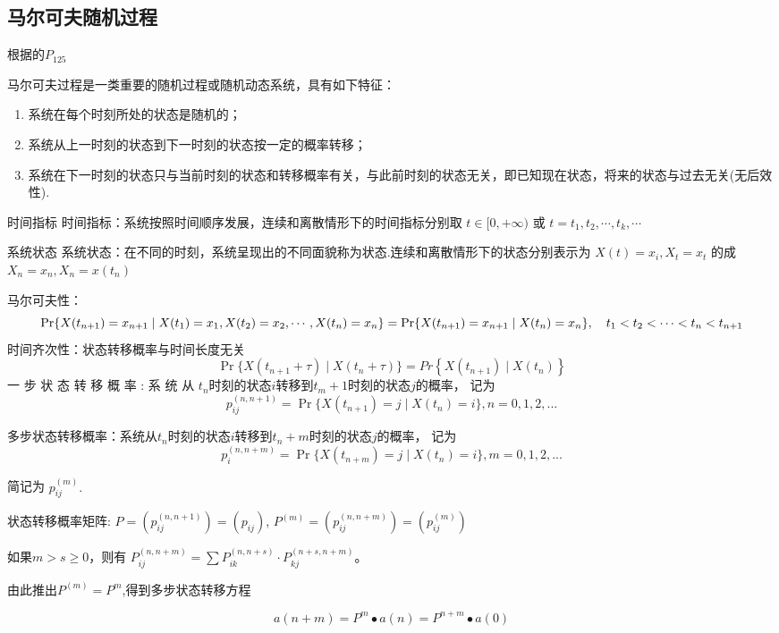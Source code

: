 \documentclass[12pt]{ctexart}
\numberwithin{equation}{section} %
\begin{document}
\subsection{马尔可夫随机过程}
根据\cite{梅正阳}的$P_{125}$

马尔可夫过程是一类重要的随机过程或随机动态系统，具有如下特征： 
\begin{enumerate}
\item 系统在每个时刻所处的状态是随机的；
\item 系统从上一时刻的状态到下一时刻的状态按一定的概率转移；
\item 系统在下一时刻的状态只与当前时刻的状态和转移概率有关，与此前时刻的状态无关，即已知现在状态，将来的状态与过去无关(无后效性).
\end{enumerate}
\begin{mydef}{时间指标}
时间指标：系统按照时间顺序发展，连续和离散情形下的时间指标分别取
$t\in [ 0, + \infty )$ 或 $t= t_1, t_2, \cdots , t_k, \cdots$
\end{mydef}
\begin{mydef}{系统状态}
系统状态：在不同的时刻，系统呈现出的不同面貌称为状态.连续和离散情形下的状态分别表示为
$X(t)=x_i,X_t=x_t$ 的成 $X_n= x_n,X_n= x( t_n)$
\end{mydef}
马尔可夫性：
$$\Pr\{X(t_{n+1})=x_{n+1}\mid X(t_{1})=x_{1},X(t_{2})=x_{2},\cdots,X(t_{n})=x_{n}\}\\=\Pr\{X(t_{n+1})=x_{n+1}\mid X(t_{n})=x_{n}\},\quad t_{1}<t_{2}<\cdots<t_{n}<t_{n+1}$$
时间齐次性：状态转移概率与时间长度无关
 $$\Pr \{ X( t_{n+ 1}+ \tau ) \mid X( t_n+ \tau ) \}= Pr\left \{ X( t_{n+ 1}) \mid X( t_n) \right \}$$
一 步 状 态 转 移 概 率 : 系 统 从 $t_n$时刻的状态$i$转移到$t_m+1$时刻的状态$j$的概率， 记为
$$p_{ij}^{(n,n+1)}=\Pr\{X(t_{n+1})=j\mid X(t_n)=i\},n=0,1,2,...$$


多步状态转移概率：系统从$t_n$时刻的状态$i$转移到$t_n+m$时刻的状态$j$的概率，
记为
$$p_i^{(n,n+m)}=\Pr\{X(t_{n+m})=j\mid X(t_{n})=i\},m=0,1,2,...$$



简记为 $p_{ij}^{(m)}.$ 

状态转移概率矩阵:
$P= ( p_{ij}^{(n, n+ 1)}) = ( p_{ij})$, $P^{( m) }= ( p_{ij}^{( n, n+ m) }) = ( p_{ij}^{( m) })$
\begin{mytheo}{}
如果\( m > s \geqslant 0 \)，则有 \( P_{ij}^{(n,n+m)} = \sum P_{ik}^{(n,n+s)} \cdot P_{kj}^{(n+s,n+m)} \)。
\end{mytheo}
由此推出$P^{(m)}=P^m$,得到多步状态转移方程

$$a(n+m)=P^m\bullet a(n)=P^{n+m}\bullet a(0)$$
\end{document}
